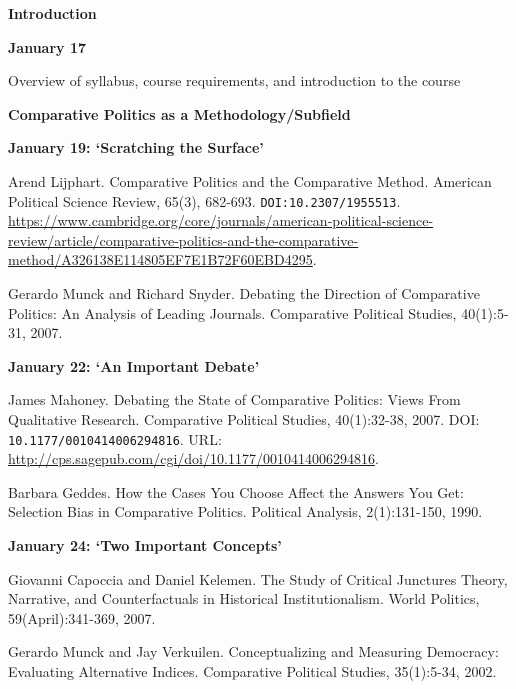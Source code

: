 \documentclass[letterpaper]{article}
\renewenvironment{itemize}{
  \begin{list}{}{
    \setlength{\leftmargin}{1.5em}
  }
}{
  \end{list}
}
\begin{document}
\begin{enumerate}

\item[] {\bf Introduction}
	\begin{itemize}
		\item {\bf January 17}
			\begin{itemize}
				\item[$\bullet$] Overview of syllabus, course requirements, and introduction to the course
			\end{itemize}
	\end{itemize}


\item {\bf Comparative Politics as a Methodology/Subfield}
	\begin{itemize}
		\item {\bf January 19: `Scratching the Surface'}
		\begin{itemize}
			\item[$\bullet$] Arend Lijphart. Comparative Politics and the Comparative Method. American Political Science Review, 65(3), 682-693. \texttt{DOI:10.2307/1955513}. \url{https://www.cambridge.org/core/journals/american-political-science-review/article/comparative-politics-and-the-comparative-method/A326138E114805EF7E1B72F60EBD4295}.
			\item[$\bullet$] Gerardo Munck and Richard Snyder. Debating the Direction of Comparative Politics: An Analysis of Leading Journals. Comparative Political Studies, 40(1):5-31, 2007.
		\end{itemize}
		
		\item {\bf January 22: `An Important Debate'}
			\begin{itemize}
				\item[$\bullet$] James Mahoney. Debating the State of Comparative Politics: Views From Qualitative Research. Comparative Political Studies, 40(1):32-38, 2007. DOI: \texttt{10.1177/0010414006294816}. URL: \url{http://cps.sagepub.com/cgi/doi/10.1177/0010414006294816}.
				\item[$\bullet$] Barbara Geddes. How the Cases You Choose Affect the Answers You Get: Selection Bias in Comparative Politics. Political Analysis, 2(1):131-150, 1990.
			\end{itemize}

		\item {\bf January 24: `Two Important Concepts'}
			\begin{itemize}	
				\item[$\bullet$] Giovanni Capoccia and Daniel Kelemen. The Study of Critical Junctures Theory, Narrative, and Counterfactuals in Historical Institutionalism. World Politics, 59(April):341-369, 2007.
				\item[$\bullet$] Gerardo Munck and Jay Verkuilen. Conceptualizing and Measuring Democracy: Evaluating Alternative Indices. Comparative Political Studies, 35(1):5-34, 2002.
			\end{itemize}




\end{itemize}
\end{enumerate}
\end{document}
